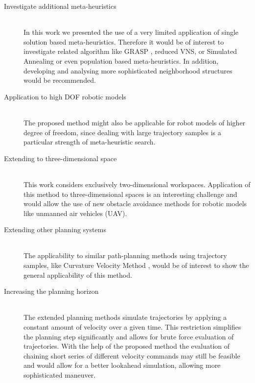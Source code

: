 \begin{description}
\item[Investigate additional meta-heuristics]\hfill \\
In this work we presented the use of a very limited application of single solution based meta-heuristics. Therefore it would be of interest to investigate related algorithm like GRASP \cite{feo1995grasp}, reduced VNS, or Simulated Annealing \cite{Kirkpatrick83SimulatedAnnealing} or even population based meta-heuristics.
In addition, developing and analysing more sophisticated neighborhood structures would be recommended. 

\item[Application to high DOF robotic models]\hfill \\
The proposed method might also be applicable for robot models of higher degree of freedom, since dealing with large trajectory samples is a particular strength of meta-heuristic search.

\item[Extending to three-dimensional space]\hfill \\
This work considers exclusively two-dimensional workspaces. Application of this method to three-dimensional spaces is an interesting challenge and would allow the use of new obstacle avoidance methods for robotic models like unmanned air vehicles (UAV).

\item[Extending other planning systems]\hfill \\
The applicability to similar path-planning methods using trajectory samples, like Curvature Velocity Method \cite{simmons1996curvature}, would be of interest to show the general applicability of this method. 


\item[Increasing the planning horizon]\hfill \\
The extended planning methods simulate trajectories by applying a constant amount of velocity over a given time. This restriction simplifies the planning step significantly and allows for brute force evaluation of trajectories. With the help of the proposed method the evaluation of chaining short series of different velocity commands may still be feasible and would allow for a better lookahead simulation, allowing more sophisticated maneuver.

\end{description}
